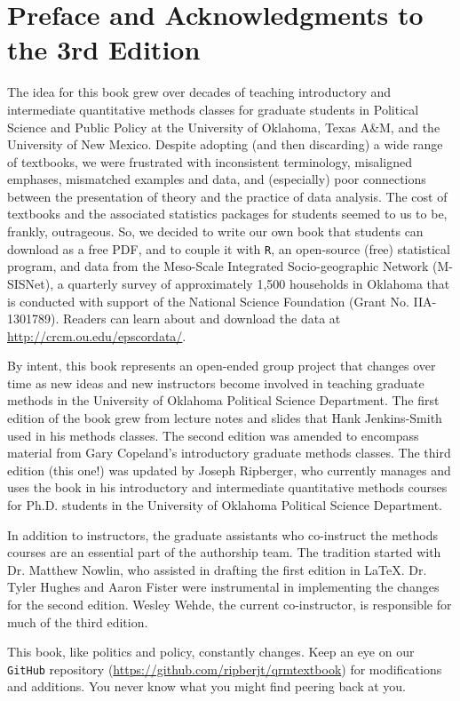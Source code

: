 \documentclass[11pt,openany]{book}\usepackage[]{graphicx}\usepackage[]{color}
\begin{document}
\chapter*{Preface and Acknowledgments to the 3rd Edition}
The idea for this book grew over decades of teaching introductory and intermediate quantitative methods classes for graduate students in Political Science and Public Policy at the University of Oklahoma, Texas A\&M, and the University of New Mexico. Despite adopting (and then discarding) a wide range of textbooks, we were frustrated with inconsistent terminology, misaligned emphases, mismatched examples and data, and (especially) poor connections between the presentation of theory and the practice of data analysis. The cost of textbooks and the associated statistics packages for students seemed to us to be, frankly, outrageous. So, we decided to write our own book that students can download as a free PDF, and to couple it with \texttt{R}, an open-source (free) statistical program, and data from the Meso-Scale Integrated Socio-geographic Network (M-SISNet), a quarterly survey of approximately 1,500 households in Oklahoma that is conducted with support of the National Science Foundation (Grant No. IIA-1301789). Readers can learn about and download the data at \url{http://crcm.ou.edu/epscordata/}.

By intent, this book represents an open-ended group project that changes over time as new ideas and new instructors become involved in teaching graduate methods in the University of Oklahoma Political Science Department. The first edition of the book grew from lecture notes and slides that Hank Jenkins-Smith used in his methods classes. The second edition was amended to encompass material from Gary Copeland’s introductory graduate methods classes. The third edition (this one!) was updated by Joseph Ripberger, who currently manages and uses the book in his introductory and intermediate quantitative methods courses for Ph.D. students in the University of Oklahoma Political Science Department.

In addition to instructors, the graduate assistants who co-instruct the methods courses are an essential part of the authorship team. The tradition started with Dr. Matthew Nowlin, who assisted in drafting the first edition in \LaTeX. Dr. Tyler Hughes and Aaron Fister were instrumental in implementing the changes for the second edition. Wesley Wehde, the current co-instructor, is responsible for much of the third edition. 

This book, like politics and policy, constantly changes. Keep an eye on our \texttt{GitHub} repository (\url{https://github.com/ripberjt/qrmtextbook}) for modifications and additions. You never know what you might find peering back at you.\\
\end{document}
